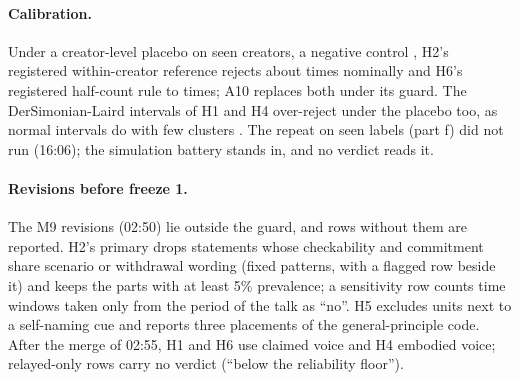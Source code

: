 \paragraph{Calibration.} Under a creator-level placebo on seen creators, a negative control \cite{lipsitch2010negative},
H2's registered within-creator reference rejects about \HTwoRefTimesNominal{} times nominally and H6's registered
half-count rule \HSixRefTimesLo{} to \HSixRefTimesHi{} times; A10 replaces both under its guard. The DerSimonian-Laird
intervals of H1 and H4 over-reject under the placebo too, as normal intervals do with few clusters
\cite{cameron2008bootstrapbased,mackinnon2022clusterrobust}. The repeat on seen labels (part f) did not run (16:06); the
simulation battery stands in, and no verdict reads it.

\paragraph{Revisions before freeze 1.} The M9 revisions (02:50) lie outside the guard, and rows without them are
reported. H2's primary drops statements whose checkability and commitment share scenario or withdrawal wording (fixed
patterns, with a flagged row beside it) and keeps the parts with at least 5\% prevalence; a sensitivity row counts time
windows taken only from the period of the talk as ``no''. H5 excludes units next to a self-naming cue and reports three
placements of the general-principle code. After the merge of 02:55, H1 and H6 use claimed voice and H4 embodied voice;
relayed-only rows carry no verdict (``below the reliability floor'').

